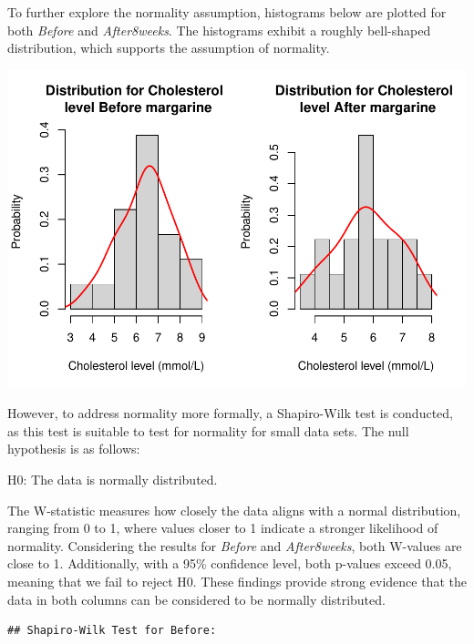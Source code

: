 \documentclass[
  11pt,
]{article}
\newenvironment{Shaded}{\begin{snugshade}}{\end{snugshade}}
\newcommand{\FunctionTok}[1]{\textcolor[rgb]{0.13,0.29,0.53}{\textbf{#1}}}
\newcommand{\NormalTok}[1]{#1}
\newcommand{\OtherTok}[1]{\textcolor[rgb]{0.56,0.35,0.01}{#1}}
\newcommand{\SpecialCharTok}[1]{\textcolor[rgb]{0.81,0.36,0.00}{\textbf{#1}}}
\begin{document}
To further explore the normality assumption, histograms below are
plotted for both \emph{Before} and \emph{After8weeks}. The histograms
exhibit a roughly bell-shaped distribution, which supports the
assumption of normality.

\includegraphics{ReportAssignment1_files/figure-latex/unnamed-chunk-4-1.pdf}

However, to address normality more formally, a Shapiro-Wilk test is
conducted, as this test is suitable to test for normality for small data
sets. The null hypothesis is as follows:

H0: The data is normally distributed.

The W-statistic measures how closely the data aligns with a normal
distribution, ranging from 0 to 1, where values closer to 1 indicate a
stronger likelihood of normality. Considering the results for
\emph{Before} and \emph{After8weeks}, both W-values are close to 1.
Additionally, with a 95\% confidence level, both p-values exceed 0.05,
meaning that we fail to reject H0. These findings provide strong
evidence that the data in both columns can be considered to be normally
distributed.

\begin{Shaded}
\end{Shaded}

\begin{verbatim}
## Shapiro-Wilk Test for Before:
\end{verbatim}
\end{document}
